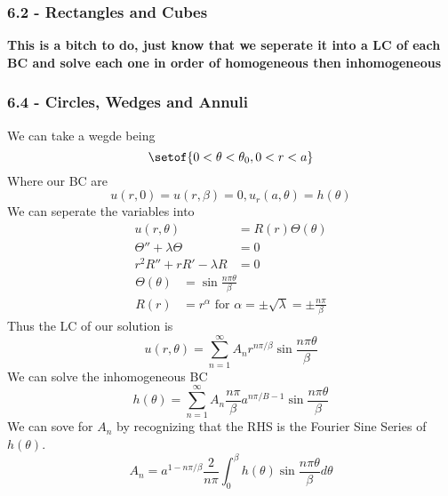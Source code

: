 \documentclass[answers,12pt,addpoints]{exam}
\begin{document}
\subsubsection{6.2 - Rectangles and Cubes}
\textbf{This is a bitch to do, just know that we seperate it into a LC of each BC and solve each one in order of homogeneous then inhomogeneous}

\subsubsection{6.4 - Circles, Wedges and Annuli}
\begin{definition}[Wedge]
    We can take a wegde being 
    $$\setof{0 < \theta < \theta_0, 0 < r < a}$$
    Where our BC are 
    $$ u(r,0) =  u(r,\beta) = 0, u_r(a, \theta) = h(\theta)$$
    We can seperate the variables into 
    \begin{align*}
        u(r,\theta) &= R(r)\Theta(\theta) \\
        \Theta'' + \lambda \Theta &= 0 \\
        r^2 R'' + r R' - \lambda R &= 0
    \end{align*}
    \begin{align*}
        \Theta(\theta) &= \sin\frac{n \pi \theta}{\beta} \\
        R(r) &= r^{\alpha} \text{ for }  \alpha = \pm \sqrt{\lambda} = \pm \frac{n \pi }{\beta}
    \end{align*}
    Thus the LC of our solution is 
    $$ u(r,\theta) = \sum_{n=1}^{\infty} A_n r^{n \pi / \beta} \sin \frac{n \pi \theta}{\beta}$$
    We can solve the inhomogeneous BC
    $$ h(\theta) = \sum_{n=1}^{\infty} A_n \frac{n \pi}{\beta} a^{n \pi /B -1} \sin \frac{n \pi \theta}{\beta}$$
    We can sove for $A_n$ by recognizing that the RHS is the Fourier Sine Series of $h(\theta)$.
    $$ A_n = a^{1 - n \pi / \beta} \frac{2}{n \pi} \int_0^{\beta} h(\theta) \sin \frac{n \pi \theta}{\beta} d\theta$$
\end{definition}
\begin{definition}[Annulus]
    
\end{definition}
\begin{definition}
    
\end{definition}
\end{document}
